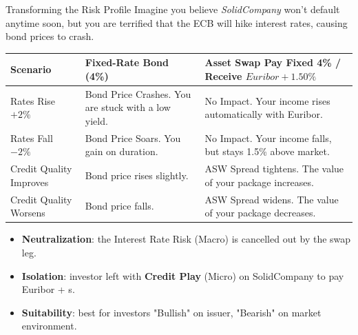 \documentclass{beamer}
\begin{document}
\begin{frame}{Transforming the Risk Profile}
	Imagine you believe \emph{SolidCompany} won't default anytime soon, but you are terrified that the ECB will hike interest rates, causing bond prices to crash.

	\begin{table}[]
		\centering
		\scriptsize
		\begin{tabular}{|p{2cm}|p{6cm}|p{6cm}|}
			\hline
			\textbf{Scenario} & \textbf{Fixed-Rate Bond} (4\%) & \textbf{Asset Swap} Pay Fixed 4\% / Receive $Euribor + 1.50\%$ \\ \hline
			Rates Rise $+2\%$ & Bond Price Crashes. You are stuck with a low yield. & No Impact. Your income rises automatically with Euribor. \\ \hline
			Rates Fall $-2\%$	 & Bond Price Soars. You gain on duration. & No Impact. Your income falls, but stays 1.5\% above market. \\ \hline
			Credit Quality Improves & Bond price rises slightly. & ASW Spread tightens. The value of your package increases. \\ \hline
			Credit Quality Worsens & Bond price falls. & ASW Spread widens. The value of your package decreases. \\ \hline
		\end{tabular}
	\end{table}

	\begin{itemize}
		\item \textbf{Neutralization}: the \textcolor{maincolor}{Interest Rate Risk} (Macro) is cancelled out by the swap leg.
		\item \textbf{Isolation}: investor left with \textbf{Credit Play} (Micro) on SolidCompany to pay Euribor + s.
		\item \textbf{Suitability}: best for investors "Bullish" on issuer, "Bearish" on market environment.
	\end{itemize}
\end{frame}
\end{document}
